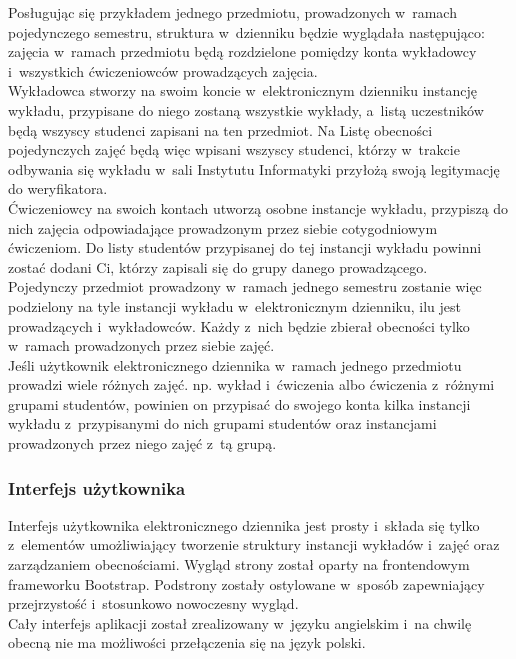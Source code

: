 \documentclass[declaration,shortabstract, mgr]{iithesis}
\begin{document}
\indent Posługując się przykładem jednego przedmiotu, prowadzonych w~ramach pojedynczego semestru, struktura w~dzienniku będzie wyglądała następująco: zajęcia w~ramach przedmiotu będą rozdzielone pomiędzy konta wykładowcy i~wszystkich ćwiczeniowców prowadzących zajęcia. \\
\indent Wykładowca stworzy na swoim koncie w~elektronicznym dzienniku instancję wykładu, przypisane do niego zostaną wszystkie wykłady, a~listą uczestników będą wszyscy studenci zapisani na ten przedmiot. Na Listę obecności pojedynczych zajęć będą więc wpisani wszyscy studenci, którzy w~trakcie odbywania się wykładu w~sali Instytutu Informatyki przyłożą swoją legitymację do weryfikatora.\\
\indent Ćwiczeniowcy na swoich kontach utworzą osobne instancje wykładu, przypiszą do nich zajęcia odpowiadające prowadzonym przez siebie cotygodniowym ćwiczeniom. Do listy studentów przypisanej do tej instancji wykładu powinni zostać dodani Ci, którzy zapisali się do grupy danego prowadzącego. \\
\indent Pojedynczy przedmiot prowadzony w~ramach jednego semestru zostanie więc podzielony na tyle instancji wykładu w~elektronicznym dzienniku, ilu jest prowadzących i~wykładowców. Każdy z~nich będzie zbierał obecności tylko w~ramach prowadzonych przez siebie zajęć. \\
\indent Jeśli użytkownik elektronicznego dziennika w~ramach jednego przedmiotu prowadzi wiele różnych zajęć. np. wykład i~ćwiczenia albo ćwiczenia z~różnymi grupami studentów, powinien on przypisać do swojego konta kilka instancji wykładu z~przypisanymi do nich grupami studentów oraz instancjami prowadzonych przez niego zajęć z~tą grupą.

\subsubsection{Interfejs użytkownika}
\indent Interfejs użytkownika elektronicznego dziennika jest prosty i~składa się tylko z~elementów umożliwiający tworzenie struktury instancji wykładów i~zajęć oraz zarządzaniem obecnościami. Wygląd strony został oparty na frontendowym frameworku Bootstrap\cite{bootstrap}.
Podstrony zostały ostylowane w~sposób zapewniający przejrzystość i~stosunkowo nowoczesny wygląd. \\
\indent Cały interfejs aplikacji został zrealizowany w~języku angielskim i~na chwilę obecną nie ma możliwości przełączenia się na język polski.\\
\end{document}
